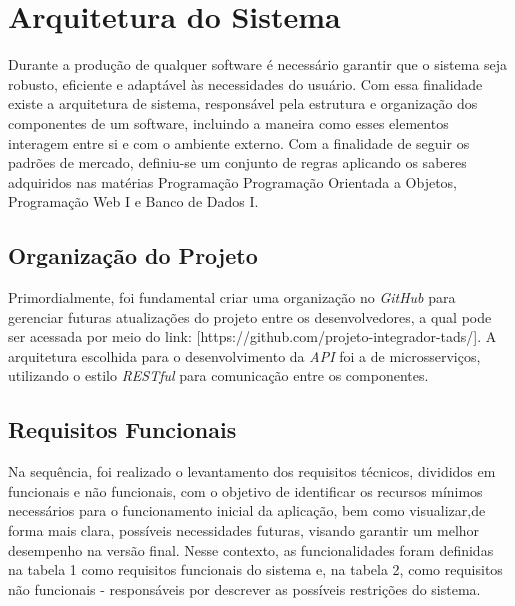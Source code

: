 

\section{Arquitetura do Sistema}

Durante a produção de qualquer software é necessário garantir que o sistema seja robusto, eficiente e adaptável às necessidades do usuário. Com essa finalidade existe a arquitetura de sistema, responsável pela estrutura e organização dos componentes de um software, incluindo a maneira como esses elementos interagem entre si e com o ambiente externo. Com a finalidade de seguir os padrões de mercado, definiu-se um conjunto de regras aplicando os saberes adquiridos nas matérias Programação Programação Orientada a Objetos, Programação Web I e Banco de Dados I.

\subsection{Organização do Projeto}

Primordialmente, foi fundamental criar uma organização no \textit{ GitHub} para gerenciar futuras atualizações do projeto entre os desenvolvedores, a qual pode ser acessada por meio do link: [https://github.com/projeto-integrador-tads/]. A arquitetura escolhida para o desenvolvimento da \textit{API} foi a de microsserviços, utilizando o estilo \textit{RESTful} para comunicação entre os componentes. 

\subsection{Requisitos Funcionais}

Na sequência, foi realizado o levantamento dos requisitos técnicos, divididos em funcionais e não funcionais, com o objetivo de identificar os recursos mínimos necessários para o funcionamento inicial da aplicação, bem como visualizar,de forma mais clara, possíveis necessidades futuras, visando garantir um melhor desempenho na versão final. Nesse contexto, as funcionalidades foram definidas na tabela 1 como requisitos funcionais do sistema e, na tabela 2, como requisitos não funcionais - responsáveis por descrever as possíveis restrições do sistema.


